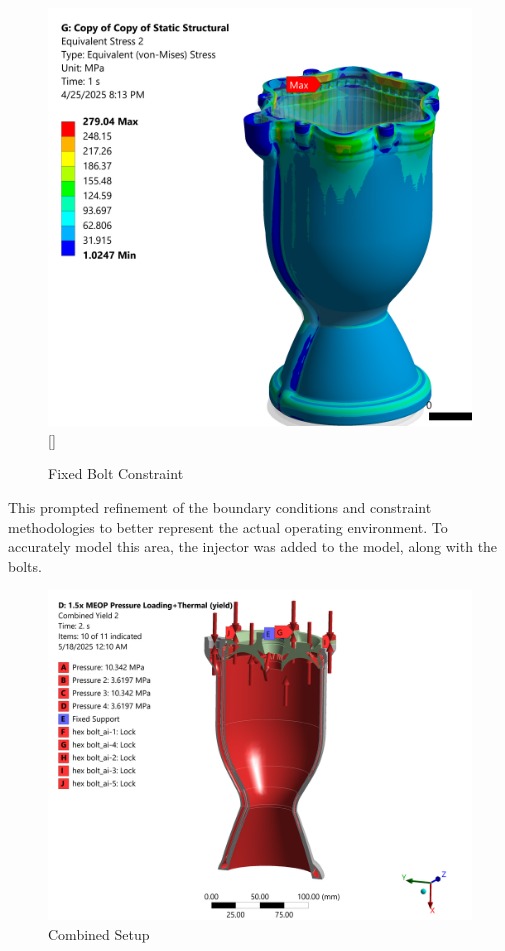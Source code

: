 \begin{figure}
    \centering
    \includegraphics[width=1\linewidth]{isolatedchamber.png}\ref{}
    \caption{Fixed Bolt Constraint}
    \label{fig:fixedbolt}
\end{figure}
 
This prompted refinement of the boundary conditions and constraint methodologies to better represent the actual operating environment. To accurately model this area, the injector was added to the model, along with the bolts.  

\begin{figure}
    \centering
    \includegraphics[width=1\linewidth]{Images/CombinedSetup.png}
    \caption{Combined Setup}
    \label{fig:CombinedSetup}
\end{figure}
